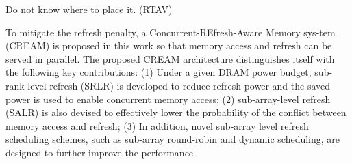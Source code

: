 Do not know where to place it. (RTAV)\cite{cream}

To mitigate the refresh penalty, a Concurrent-REfresh-Aware Memory sys-tem (CREAM) is proposed in this work so that memory access and refresh can be served in parallel. The proposed CREAM architecture distinguishes itself with the following key contributions: (1) Under a given DRAM power budget,
sub-rank-level refresh (SRLR) is developed to reduce refresh power and the saved power is used to enable concurrent memory access; (2) sub-array-level refresh (SALR) is also devised to effectively lower the probability of the conflict between memory access and refresh; (3) In addition, novel sub-array level refresh scheduling schemes, such as sub-array round-robin and dynamic scheduling, are designed to further improve the performance